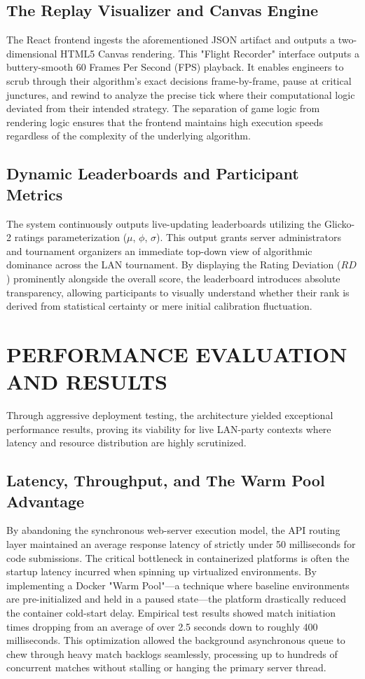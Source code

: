 \documentclass[12pt,a4paper]{report}
\begin{document}
\subsection{The Replay Visualizer and Canvas Engine}
The React frontend ingests the aforementioned JSON artifact and outputs a two-dimensional HTML5 Canvas rendering. This "Flight Recorder" interface outputs a buttery-smooth 60 Frames Per Second (FPS) playback. It enables engineers to scrub through their algorithm's exact decisions frame-by-frame, pause at critical junctures, and rewind to analyze the precise tick where their computational logic deviated from their intended strategy. The separation of game logic from rendering logic ensures that the frontend maintains high execution speeds regardless of the complexity of the underlying algorithm.

\subsection{Dynamic Leaderboards and Participant Metrics}
The system continuously outputs live-updating leaderboards utilizing the Glicko-2 ratings parameterization ($\mu$, $\phi$, $\sigma$). This output grants server administrators and tournament organizers an immediate top-down view of algorithmic dominance across the LAN tournament. By displaying the Rating Deviation ($RD$) prominently alongside the overall score, the leaderboard introduces absolute transparency, allowing participants to visually understand whether their rank is derived from statistical certainty or mere initial calibration fluctuation.

\section{PERFORMANCE EVALUATION AND RESULTS}
Through aggressive deployment testing, the architecture yielded exceptional performance results, proving its viability for live LAN-party contexts where latency and resource distribution are highly scrutinized. 

\subsection{Latency, Throughput, and The Warm Pool Advantage}
By abandoning the synchronous web-server execution model, the API routing layer maintained an average response latency of strictly under 50 milliseconds for code submissions. The critical bottleneck in containerized platforms is often the startup latency incurred when spinning up virtualized environments. By implementing a Docker "Warm Pool"—a technique where baseline environments are pre-initialized and held in a paused state—the platform drastically reduced the container cold-start delay. Empirical test results showed match initiation times dropping from an average of over 2.5 seconds down to roughly 400 milliseconds. This optimization allowed the background asynchronous queue to chew through heavy match backlogs seamlessly, processing up to hundreds of concurrent matches without stalling or hanging the primary server thread.
\end{document}
